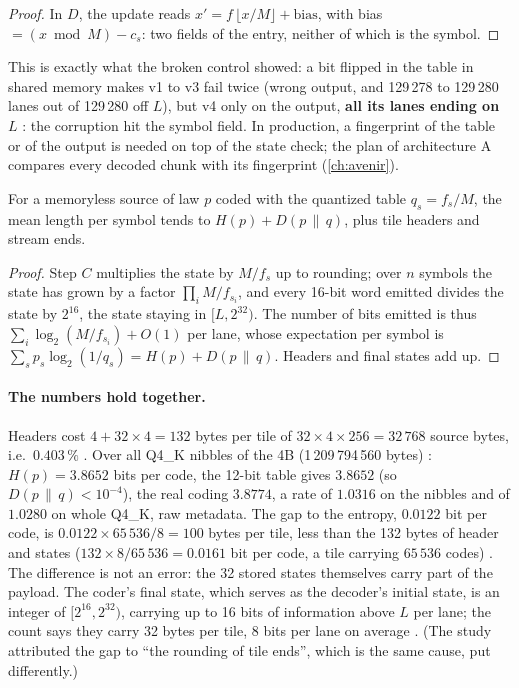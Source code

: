 \begin{proof}
In $D$, the update reads $x' = f\,\lfloor x/M\rfloor + \text{bias}$, with bias $= (x \bmod M) - c_s$: two fields of the entry, neither of which is the symbol.
\end{proof}

This is exactly what the broken control showed: a bit flipped in the table in shared memory makes v1 to v3 fail twice (wrong output, and 129\,278 to 129\,280 lanes out of 129\,280 off $L$), but v4 only on the output, \textbf{all its lanes ending on $L$} \mes: the corruption hit the symbol field. In production, a fingerprint of the table or of the output is needed on top of the state check; the plan of architecture A compares every decoded chunk with its fingerprint (\cref{ch:avenir}).

\begin{proposition}\label{prop:rans-longueur}
For a memoryless source of law $p$ coded with the quantized table $q_s = f_s/M$, the mean length per symbol tends to $H(p) + D(p \,\|\, q)$, plus tile headers and stream ends.
\end{proposition}

\begin{proof}
Step $C$ multiplies the state by $M/f_s$ up to rounding; over $n$ symbols the state has grown by a factor $\prod_i M/f_{s_i}$, and every 16-bit word emitted divides the state by $2^{16}$, the state staying in $[L, 2^{32})$. The number of bits emitted is thus $\sum_i \log_2(M/f_{s_i}) + O(1)$ per lane, whose expectation per symbol is $\sum_s p_s \log_2(1/q_s) = H(p) + D(p\,\|\,q)$. Headers and final states add up.
\end{proof}

\paragraph{The numbers hold together.} Headers cost $4 + 32 \times 4 = 132$ bytes per tile of $32 \times 4 \times 256 = 32\,768$ source bytes, i.e.\ $0.403\,\%$ \calc. Over all Q4\_K nibbles of the 4B (1\,209\,794\,560 bytes) \mes: $H(p) = 3.8652$ bits per code, the 12-bit table gives $3.8652$ (so $D(p\,\|\,q) < 10^{-4}$), the real coding $3.8774$, a rate of $1.0316$ on the nibbles and of $1.0280$ on whole Q4\_K, raw metadata. The gap to the entropy, $0.0122$ bit per code, is $0.0122 \times 65\,536/8 = 100$ bytes per tile, less than the 132 bytes of header and states ($132 \times 8 / 65\,536 = 0.0161$ bit per code, a tile carrying $65\,536$ codes) \calc. The difference is not an error: the 32 stored states themselves carry part of the payload. The coder's final state, which serves as the decoder's initial state, is an integer of $[2^{16}, 2^{32})$, carrying up to 16 bits of information above $L$ per lane; the count says they carry 32 bytes per tile, 8 bits per lane on average \calc. (The study attributed the gap to ``the rounding of tile ends'', which is the same cause, put differently.)

